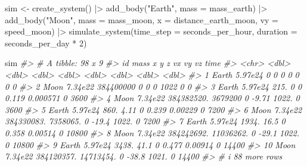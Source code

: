 \documentclass[
  10.5pt,
  letterpaper,
]{scrbook}
\newenvironment{Shaded}{\begin{snugshade}}{\end{snugshade}}
\newcommand{\AttributeTok}[1]{\textcolor[rgb]{0.00,0.00,0.00}{#1}}
\newcommand{\CommentTok}[1]{\textcolor[rgb]{0.00,0.00,0.00}{\textit{#1}}}
\newcommand{\DecValTok}[1]{\textcolor[rgb]{0.00,0.00,0.00}{#1}}
\newcommand{\FunctionTok}[1]{\textcolor[rgb]{0.00,0.00,0.00}{#1}}
\newcommand{\NormalTok}[1]{\textcolor[rgb]{0.00,0.00,0.00}{#1}}
\newcommand{\OtherTok}[1]{\textcolor[rgb]{0.00,0.00,0.00}{#1}}
\newcommand{\SpecialCharTok}[1]{\textcolor[rgb]{0.00,0.00,0.00}{#1}}
\newcommand{\StringTok}[1]{\textcolor[rgb]{0.00,0.00,0.00}{#1}}
\theoremstyle{plain}
\theoremstyle{remark}
\begin{document}
\begin{Shaded}
\begin{Highlighting}[]
\NormalTok{sim }\OtherTok{\textless{}{-}} \FunctionTok{create\_system}\NormalTok{() }\SpecialCharTok{|\textgreater{}}
  \FunctionTok{add\_body}\NormalTok{(}\StringTok{"Earth"}\NormalTok{, }\AttributeTok{mass =}\NormalTok{ mass\_earth) }\SpecialCharTok{|\textgreater{}}
  \FunctionTok{add\_body}\NormalTok{(}\StringTok{"Moon"}\NormalTok{, }\AttributeTok{mass =}\NormalTok{ mass\_moon, }\AttributeTok{x =}\NormalTok{ distance\_earth\_moon, }\AttributeTok{vy =}\NormalTok{ speed\_moon) }\SpecialCharTok{|\textgreater{}}
  \FunctionTok{simulate\_system}\NormalTok{(}\AttributeTok{time\_step =}\NormalTok{ seconds\_per\_hour, }\AttributeTok{duration =}\NormalTok{ seconds\_per\_day }\SpecialCharTok{*} \DecValTok{2}\NormalTok{)}

\NormalTok{sim}
\CommentTok{\#\textgreater{} \# A tibble: 98 x 9}
\CommentTok{\#\textgreater{}    id       mass          x           y     z      vx          vy    vz  time}
\CommentTok{\#\textgreater{}    \textless{}chr\textgreater{}   \textless{}dbl\textgreater{}      \textless{}dbl\textgreater{}       \textless{}dbl\textgreater{} \textless{}dbl\textgreater{}   \textless{}dbl\textgreater{}       \textless{}dbl\textgreater{} \textless{}dbl\textgreater{} \textless{}dbl\textgreater{}}
\CommentTok{\#\textgreater{}  1 Earth 5.97e24         0         0        0   0        0            0     0}
\CommentTok{\#\textgreater{}  2 Moon  7.34e22 384400000         0        0   0     1022            0     0}
\CommentTok{\#\textgreater{}  3 Earth 5.97e24       215.        0        0   0.119    0.000571     0  3600}
\CommentTok{\#\textgreater{}  4 Moon  7.34e22 384382520.  3679200        0  {-}9.71  1022.           0  3600}
\CommentTok{\#\textgreater{}  5 Earth 5.97e24       860.        4.11     0   0.239    0.00229      0  7200}
\CommentTok{\#\textgreater{}  6 Moon  7.34e22 384330083.  7358065.       0 {-}19.4   1022.           0  7200}
\CommentTok{\#\textgreater{}  7 Earth 5.97e24      1934.       16.5      0   0.358    0.00514      0 10800}
\CommentTok{\#\textgreater{}  8 Moon  7.34e22 384242692. 11036262.       0 {-}29.1   1022.           0 10800}
\CommentTok{\#\textgreater{}  9 Earth 5.97e24      3438.       41.1      0   0.477    0.00914      0 14400}
\CommentTok{\#\textgreater{} 10 Moon  7.34e22 384120357. 14713454.       0 {-}38.8   1021.           0 14400}
\CommentTok{\#\textgreater{} \# i 88 more rows}
\end{Highlighting}
\end{Shaded}
\end{document}
